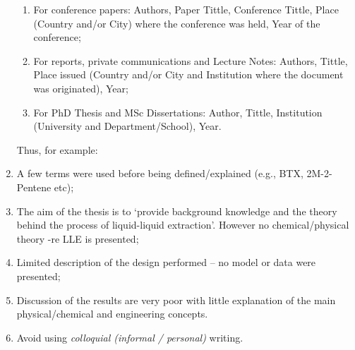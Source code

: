 \documentclass[14pt,twoside]{report}
\begin{document}
\begin{enumerate}
\begin{enumerate}
\item For conference papers: Authors, Paper Tittle, Conference Tittle, Place (Country and/or City) where the conference was held, Year of the conference;
\item For reports, private communications and Lecture Notes: Authors, Tittle, Place issued (Country and/or City and Institution where the document was originated), Year;
\item For PhD Thesis and MSc Dissertations: Author, Tittle, Institution (University and Department/School), Year.
\end{enumerate}  
Thus, for example:
%
\item A few terms were used before being defined/explained (e.g., BTX, 2M-2-Pentene etc); 
%
\item The aim of the thesis is to `provide background knowledge and the theory behind the process of liquid-liquid extraction'. However no chemical/physical theory -re LLE is presented;
%
\item Limited description of the design performed -- no model or data were presented;
%
\item Discussion of the results are very poor with little explanation of the main physical/chemical and engineering concepts.
%
\item Avoid using {\it colloquial (informal / personal)} writing.
% 
\end{enumerate}
\end{document}
